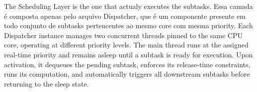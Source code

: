 The Scheduling Layer is the one that actualy executes the subtasks. Essa camada é composta apenas pelo arquivo Dispatcher, que é um componente presente em todo conjunto de subtasks pertencentes ao mesmo core com mesma  priority.
Each Dispatcher instance manages two concurrent threads pinned to the same CPU core, operating at different priority levels. The main thread runs at the assigned real-time priority and remains asleep until a subtask is ready for execution. Upon activation, it dequeues the pending subtask, enforces its release-time constraints, runs its computation, and automatically triggers all downstream subtasks before returning to the sleep state.




